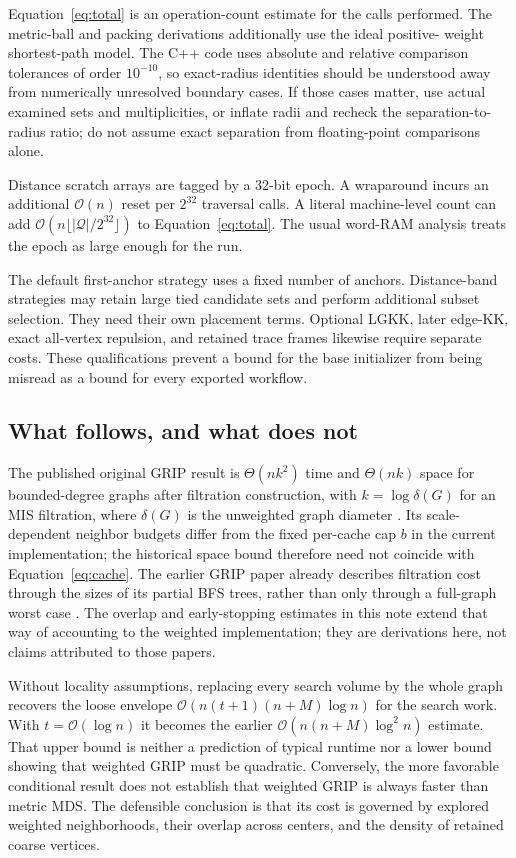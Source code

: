 \documentclass[11pt,a4paper]{article}
\newcommand{\bigO}{\mathcal O}
\begin{document}
Equation~\eqref{eq:total} is an operation-count estimate for the calls performed.
The metric-ball and packing derivations additionally use the ideal positive-
weight shortest-path model. The C++ code uses absolute and relative comparison
tolerances of order $10^{-10}$, so exact-radius identities should be understood
away from numerically unresolved boundary cases. If those cases matter, use
actual examined sets and multiplicities, or inflate radii and recheck the
separation-to-radius ratio; do not assume exact separation from floating-point
comparisons alone.

Distance scratch arrays are tagged by a 32-bit epoch. A wraparound incurs
an additional $\bigO(n)$ reset per $2^{32}$ traversal calls. A literal
machine-level count can add $\bigO(n\lfloor|\mathcal Q|/2^{32}\rfloor)$ to
Equation~\eqref{eq:total}. The usual word-RAM analysis treats the epoch as large
enough for the run.

The default first-anchor strategy uses a fixed number of anchors. Distance-band
strategies may retain large tied candidate sets and perform additional subset
selection. They need their own placement terms. Optional LGKK, later edge-KK,
exact all-vertex repulsion, and retained trace frames likewise require separate
costs. These qualifications prevent a bound for the base initializer from being
misread as a bound for every exported workflow.

\subsection{What follows, and what does not}

The published original GRIP result is $\Theta(nk^2)$ time and $\Theta(nk)$
space for bounded-degree graphs after filtration construction, with
$k=\log\delta(G)$ for an MIS filtration, where $\delta(G)$ is the unweighted
graph diameter \citep{gajer2004}. Its scale-dependent neighbor budgets differ
from the fixed per-cache cap $b$ in the current implementation; the historical
space bound therefore need not coincide with Equation~\eqref{eq:cache}.
The earlier GRIP
paper already describes filtration cost through the sizes of its partial BFS
trees, rather than only through a full-graph worst case \citep{gajer2002}.
The overlap and early-stopping estimates in this note extend that way of
accounting to the weighted implementation; they are derivations here, not
claims attributed to those papers.

Without locality assumptions, replacing every search volume by the whole graph
recovers the loose envelope
$\bigO(n(t+1)(n+M)\log n)$ for the search work. With $t=\bigO(\log n)$ it becomes
the earlier $\bigO(n(n+M)\log^2 n)$ estimate. That upper bound is neither a
prediction of typical runtime nor a lower bound showing that weighted GRIP
must be quadratic. Conversely, the more favorable conditional result does not
establish that weighted GRIP is always faster than metric MDS. The defensible
conclusion is that its cost is governed by explored weighted neighborhoods,
their overlap across centers, and the density of retained coarse vertices.
\end{document}
